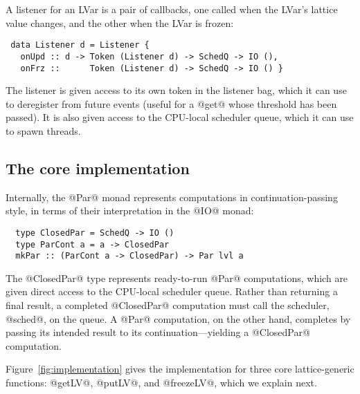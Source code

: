 A listener for an LVar is a pair of callbacks,
one called when the LVar's lattice value changes,
 and the other when the LVar is frozen:  
\begin{lstlisting}
 data Listener d = Listener {
   onUpd :: d -> Token (Listener d) -> SchedQ -> IO (),
   onFrz ::      Token (Listener d) -> SchedQ -> IO () }
\end{lstlisting}
The listener is given access to its own token in the listener bag, which it can
use to deregister from future events (useful for a @get@ whose threshold has
been passed).  It is also given access to the CPU-local scheduler queue, which
it can use to spawn threads.

\subsection{The core implementation}


Internally, the @Par@ monad represents computations in continuation-passing
style, in terms of their interpretation in the @IO@ monad:
\begin{lstlisting}
  type ClosedPar = SchedQ -> IO ()
  type ParCont a = a -> ClosedPar
  mkPar :: (ParCont a -> ClosedPar) -> Par lvl a
\end{lstlisting}
The @ClosedPar@ type represents ready-to-run @Par@ computations, which are given
direct access to the CPU-local scheduler queue.  Rather than returning a final
result, a completed @ClosedPar@ computation must call the scheduler, @sched@, on
the queue.  A @Par@ computation, on the other hand, completes by passing its
intended result to its continuation---yielding a @ClosedPar@ computation.

Figure~\ref{fig:implementation} gives the implementation for three core
lattice-generic functions: @getLV@, @putLV@, and @freezeLV@, which we explain next.


